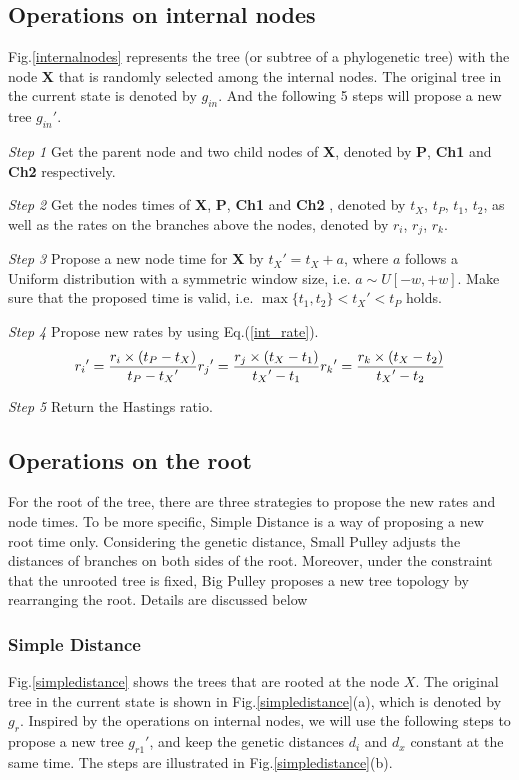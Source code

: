 \documentclass{bmcart}
\begin{document}
\subsection*{Operations on internal nodes}
Fig.\ref{internalnodes} represents the tree (or subtree of a phylogenetic tree) with the node \textbf{X} that is randomly selected among the internal nodes. The original tree in the current state is denoted by $g_{in}$. And the following 5 steps will propose a new tree ${g_{in}}'$.

\emph{Step 1} Get the parent node and two child nodes of \textbf{X}, denoted by \textbf{P}, \textbf{Ch1} and \textbf{Ch2} respectively.

\emph{Step 2} Get the nodes times of \textbf{X}, \textbf{P}, \textbf{Ch1} and \textbf{Ch2} , denoted by $t_X$, $t_P$, $t_1$, $t_2$, as well as the rates on the branches above the nodes, denoted by $r_i$, $r_j$, $r_k$.

\emph{Step 3} Propose a new node time for \textbf{X} by ${t_X}' = {t_X} + a$, where $a$ follows a Uniform distribution with a symmetric window size, i.e. $a \sim U[ - w, + w]$. Make sure that the proposed time is valid, i.e. $\max \{ {t_1},{t_2}\}  < {t_X}' < {t_P}$ holds.

\emph{Step 4} Propose new rates by using Eq.(\ref{int_rate}).
\begin{equation}
 \label{int_rate}
{r_i}' = \frac{{r_i} \times ({{t_P} - {t_X}})}{{{t_P} - {t_X}'}}\\
{r_j}' = \frac{{{r_j} \times ({{t_X} - {t_1}})}}{{{t_X}' - {t_1}}}\\
{r_k}' = \frac{{{r_k} \times ({{t_X} - {t_2}})}}{{{t_X}' - {t_2}}}
 \end{equation}

\emph{Step 5} Return the Hastings ratio.
\subsection*{Operations on the root}
For the root of the tree, there are three strategies to propose the new rates and node times. To be more specific, Simple Distance is a way of proposing a new root time only. Considering the genetic distance, Small Pulley adjusts the distances of branches on both sides of the root. Moreover, under the constraint that the unrooted tree is fixed, Big Pulley proposes a new tree topology by rearranging the root.  Details are discussed below
\subsubsection*{Simple Distance}
Fig.\ref{simpledistance} shows the trees that are rooted at the node $X$. The original tree in the current state is shown in Fig.\ref{simpledistance}(a), which is denoted by $g_r$. Inspired by the operations on internal nodes, we will use the following steps to propose a new tree ${g_{r1}}'$, and keep the genetic distances $d_i$ and $d_x$ constant at the same time. The steps are illustrated in Fig.\ref{simpledistance}(b).
\end{document}

